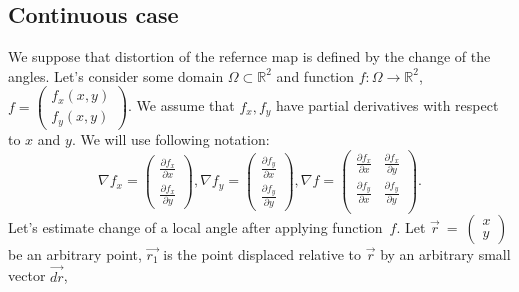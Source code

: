 \documentclass{article}
\newcommand{\vect}{\overrightarrow}
\begin{document}
\subsection{Continuous case}
\label{sec:continuous}
We suppose that distortion of the refernce map is defined by the change of the angles. 
Let's consider some domain $\Omega \subset \mathbb{R}^2$ and function $f: \Omega \to \mathbb{R}^2$, 
$f = \begin{pmatrix} f_x(x, y) \\ f_y(x, y) \end{pmatrix}$. We assume that $f_x, f_y$ have partial derivatives with respect to $x$ and $y$. 
We will use following notation:
$$
  \nabla f_x = \begin{pmatrix} \frac{\partial f_x}{\partial x} \\ \frac{\partial f_x}{\partial y} \end{pmatrix}, 
  \nabla f_y = \begin{pmatrix} \frac{\partial f_y}{\partial x} \\ \frac{\partial f_y}{\partial y} \end{pmatrix}, 
  \nabla f = \begin{pmatrix} 
    \frac{\partial f_x}{\partial x} & \frac{\partial f_x}{\partial y} \\
    \frac{\partial f_y}{\partial x} & \frac{\partial f_y}{\partial y} \\
  \end{pmatrix}. 
$$
Let's estimate change of a local angle after applying function~$f$. Let $\vect{r}~=~\begin{pmatrix} x \\ y \end{pmatrix}$ be an arbitrary point, 
$\vect{r_1}$ is the point displaced relative to $\vect{r}$ by an arbitrary small vector $\vect{dr}$, 
\end{document}
